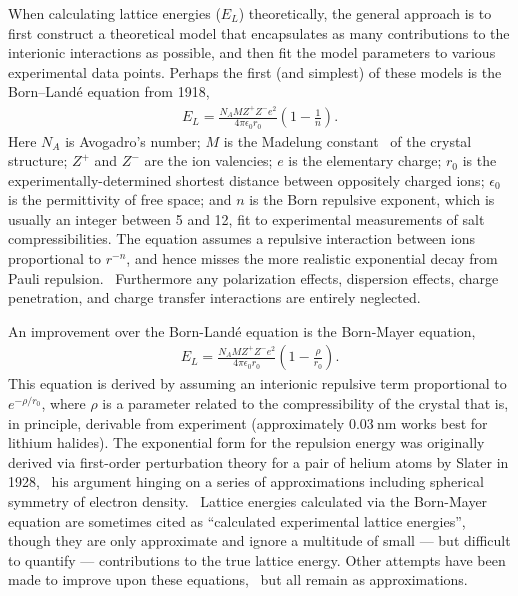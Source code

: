 \documentclass[preprint,aps,prb,floatfix]{revtex4-1}
\begin{document}
When calculating lattice energies ($E_{L}$) theoretically, the general approach is to first construct a theoretical model that encapsulates as many contributions to the interionic interactions as possible, and then fit the model parameters to various experimental data points. Perhaps the first (and simplest) of these models is the Born–Land\'{e} equation from 1918,~\cite{born1918absolute}
\begin{align}
E_{L} = \frac { N _ { A } M Z ^ { + } Z ^ { - } e ^ { 2 } } { 4 \pi \epsilon _ { 0 } r _ { 0 } } \left( 1 - \frac { 1 } { n } \right).
\label{eq:BornLande}
\end{align}
Here $N_{A}$ is Avogadro's number; $M$ is the Madelung constant~\cite{madelung1918elektrische} of the crystal structure; $Z^{+}$ and $Z^{-}$ are the ion valencies; $e$ is the elementary charge; $r_{0}$ is the experimentally-determined shortest distance between oppositely charged ions; $\epsilon _ { 0 }$ is the permittivity of free space; and $n$ is the Born repulsive exponent, which is usually an integer between 5 and 12, fit to experimental measurements of salt compressibilities. The equation assumes a repulsive interaction between ions proportional to $r^{-n}$, and hence misses the more realistic exponential decay from Pauli repulsion.~\cite{Slater1928} Furthermore any polarization effects, dispersion effects, charge penetration, and charge transfer interactions are entirely neglected. 

An improvement over the Born-Land\'{e} equation is the Born-Mayer equation,~\cite{Born1932,Huggins1937,Huggins1947}
\begin{align}
E_{L} =  \frac { N _ { A } M Z ^ { + } Z ^ { - } e ^ { 2 } } { 4 \pi \epsilon _ { 0 } r _ { 0 } } \left( 1 - \frac { \rho } { r _ { 0 } } \right).
\label{eq:BornMayer}
\end{align}
This equation is derived by assuming an interionic repulsive term proportional to $e^{-\rho/r_{0}}$, where $\rho$ is a parameter related to the compressibility of the crystal that is, in principle, derivable from experiment (approximately $\SI{0.03}{\nano\meter}$ works best for lithium halides). The exponential form for the repulsion energy was originally derived via first-order perturbation theory for a pair of helium atoms by Slater in 1928,~\cite{Slater1928} his argument hinging on a series of approximations including spherical symmetry of electron density.~\cite{Buckingham1938} Lattice energies calculated via the Born-Mayer equation are sometimes cited as ``calculated experimental lattice energies'',~\cite{book:CRC} though they are only approximate and ignore a multitude of small --- but difficult to quantify --- contributions to the true lattice energy. Other attempts have been made to improve upon these equations,~\cite{Ladd1959} but all remain as approximations.
\end{document}

